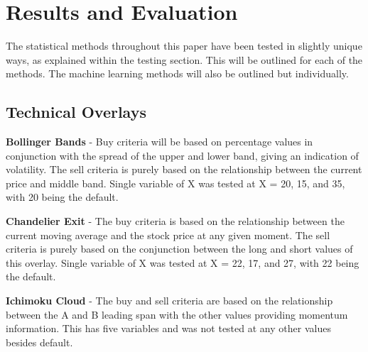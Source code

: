 \documentclass[conference]{IEEEtran}
\begin{document}
\section{Results and Evaluation}

The statistical methods throughout this paper have been tested in slightly unique ways, as explained within the testing section. This will be outlined for each of the methods. The machine learning methods will also be outlined but individually.\\

\subsection{Technical Overlays}

\textbf{Bollinger Bands} - Buy criteria will be based on percentage values in conjunction with the spread of the upper and lower band, giving an indication of volatility. The sell criteria is purely based on the relationship between the current price and middle band. Single variable of X was tested at X = 20, 15, and 35, with 20 being the default.

\textbf{Chandelier Exit} - The buy criteria is based on the relationship between the current moving average and the stock price at any given moment. The sell criteria is purely based on the conjunction between the long and short values of this overlay. Single variable of X was tested at X = 22, 17, and 27, with 22 being the default.

\textbf{Ichimoku Cloud} - The buy and sell criteria are based on the relationship between the A and B leading span with the other values providing momentum information. This has five variables and was not tested at any other values besides default.
\end{document}
